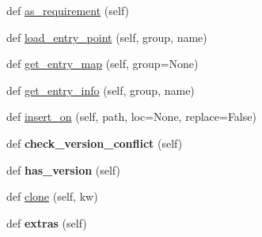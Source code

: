 \begin{DoxyCompactItemize}
def \hyperlink{classpkg__resources_1_1_distribution_a2c549b93626be28f83a4bc1734821c2b}{as\+\_\+requirement} (self)
\item 
def \hyperlink{classpkg__resources_1_1_distribution_a2a3097439745646ac5be811f39c2aca8}{load\+\_\+entry\+\_\+point} (self, group, name)
\item 
def \hyperlink{classpkg__resources_1_1_distribution_a62bf46d7615519b2b455498257f9d536}{get\+\_\+entry\+\_\+map} (self, group=None)
\item 
def \hyperlink{classpkg__resources_1_1_distribution_a2eb224328a194967021953cd6a122011}{get\+\_\+entry\+\_\+info} (self, group, name)
\item 
def \hyperlink{classpkg__resources_1_1_distribution_a26864ad682f37623654f162a1d0a4c8b}{insert\+\_\+on} (self, path, loc=None, replace=False)
\item 
\mbox{\label{classpkg__resources_1_1_distribution_aecfb70fc29bf652604ed7e97866cd549}} 
def {\bfseries check\+\_\+version\+\_\+conflict} (self)
\item 
\mbox{\label{classpkg__resources_1_1_distribution_aa8b8ad9f54c86275b77b1966881df122}} 
def {\bfseries has\+\_\+version} (self)
\item 
def \hyperlink{classpkg__resources_1_1_distribution_ad737fac85435aff74ecb2fab234ba930}{clone} (self, kw)
\item 
\mbox{\label{classpkg__resources_1_1_distribution_ae382387ed776b026046d59a56291b805}} 
def {\bfseries extras} (self)
\end{DoxyCompactItemize}
